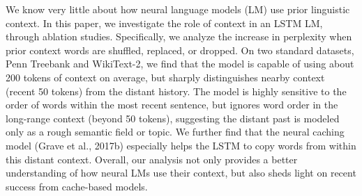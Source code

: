 We know very little about how neural language models (LM) use prior linguistic context. In this paper, we investigate the role of context in an LSTM LM, through ablation studies. Specifically, we analyze the increase in perplexity when prior context words are shuffled, replaced, or dropped. On two standard datasets, Penn Treebank and WikiText-2, we find that the model is capable of using about 200 tokens of context on average, but sharply distinguishes nearby context (recent 50 tokens) from the distant history. The model is highly sensitive to the order of words within the most recent sentence, but ignores word order in the long-range context (beyond 50 tokens), suggesting the distant past is modeled only as a rough semantic field or topic. We further find that the neural caching model (Grave et al., 2017b) especially helps the LSTM to copy words from within this distant context. Overall, our analysis not only provides a better understanding of how neural LMs use their context, but also sheds light on recent success from cache-based models.
